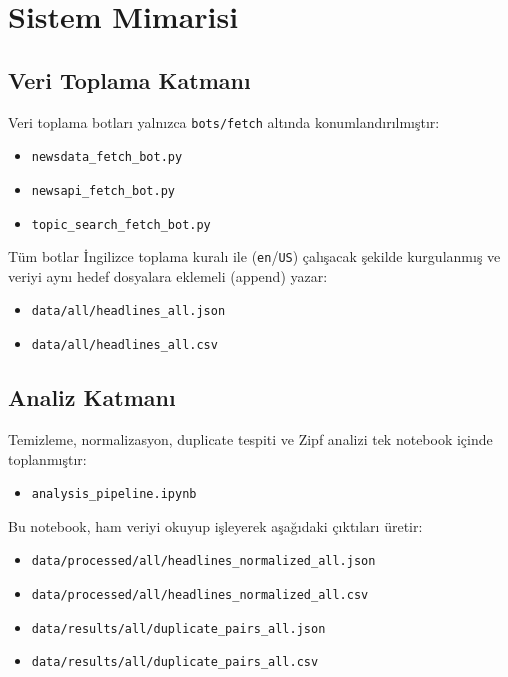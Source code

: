 \documentclass[12pt,a4paper]{article}
\begin{document}
\section{Sistem Mimarisi}
\subsection{Veri Toplama Katman\i{}}
Veri toplama botlar\i{} yaln\i{}zca \texttt{bots/fetch} alt\i{}nda konumland\i{}r\i{}lm\i{}\c{s}t\i{}r:
\begin{itemize}
    \item \texttt{newsdata\_fetch\_bot.py}
    \item \texttt{newsapi\_fetch\_bot.py}
    \item \texttt{topic\_search\_fetch\_bot.py}
\end{itemize}

T\"um botlar \.{I}ngilizce toplama kural\i{} ile (\texttt{en}/\texttt{US}) \c{c}al\i{}\c{s}acak \c{s}ekilde kurgulanm\i{}\c{s} ve veriyi ayn\i{} hedef dosyalara eklemeli (append) yazar:
\begin{itemize}
    \item \texttt{data/all/headlines\_all.json}
    \item \texttt{data/all/headlines\_all.csv}
\end{itemize}

\subsection{Analiz Katman\i{}}
Temizleme, normalizasyon, duplicate tespiti ve Zipf analizi tek notebook i\c{c}inde toplanm\i{}\c{s}t\i{}r:
\begin{itemize}
    \item \texttt{analysis\_pipeline.ipynb}
\end{itemize}
Bu notebook, ham veriyi okuyup i\c{s}leyerek a\c{s}a\u{g}\i{}daki \c{c}\i{}kt\i{}lar\i{} \"uretir:
\begin{itemize}
    \item \texttt{data/processed/all/headlines\_normalized\_all.json}
    \item \texttt{data/processed/all/headlines\_normalized\_all.csv}
    \item \texttt{data/results/all/duplicate\_pairs\_all.json}
    \item \texttt{data/results/all/duplicate\_pairs\_all.csv}
\end{itemize}
\end{document}
